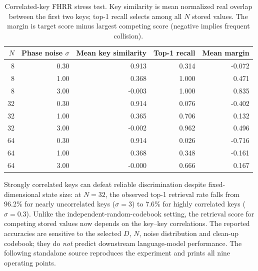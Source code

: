\documentclass[11pt,a4paper]{article}
\theoremstyle{plain}
\theoremstyle{definition}
\theoremstyle{remark}
\begin{document}
\begin{table}[htbp]
\centering
\small
\caption{Correlated-key FHRR stress test. Key similarity is mean normalized real overlap between the first two keys; top-1 recall selects among all $N$ stored values. The margin is target score minus largest competing score (negative implies frequent collision).}
\label{tab:correlated_keys}
\begin{tabular}{rrrrr}
\toprule
$N$ & Phase noise $\sigma$ & Mean key similarity & Top-1 recall & Mean margin \\
\midrule
8 & 0.30 & 0.913 & 0.314 & -0.072 \\
8 & 1.00 & 0.368 & 1.000 & 0.471 \\
8 & 3.00 & -0.003 & 1.000 & 0.835 \\
32 & 0.30 & 0.914 & 0.076 & -0.402 \\
32 & 1.00 & 0.365 & 0.706 & 0.132 \\
32 & 3.00 & -0.002 & 0.962 & 0.496 \\
64 & 0.30 & 0.914 & 0.026 & -0.716 \\
64 & 1.00 & 0.368 & 0.348 & -0.161 \\
64 & 3.00 & -0.000 & 0.666 & 0.167 \\
\bottomrule
\end{tabular}
\end{table}

Strongly correlated keys can defeat reliable discrimination despite fixed-dimensional state size: at $N=32$, the observed top-1 retrieval rate falls from 96.2\% for nearly uncorrelated keys ($\sigma=3$) to 7.6\% for highly correlated keys ($\sigma=0.3$). Unlike the independent-random-codebook setting, the retrieval score for competing stored values now depends on the key--key correlations. The reported accuracies are sensitive to the selected $D$, $N$, noise distribution and clean-up codebook; they do \emph{not} predict downstream language-model performance. The following standalone source reproduces the experiment and prints all nine operating points.


\end{document}
